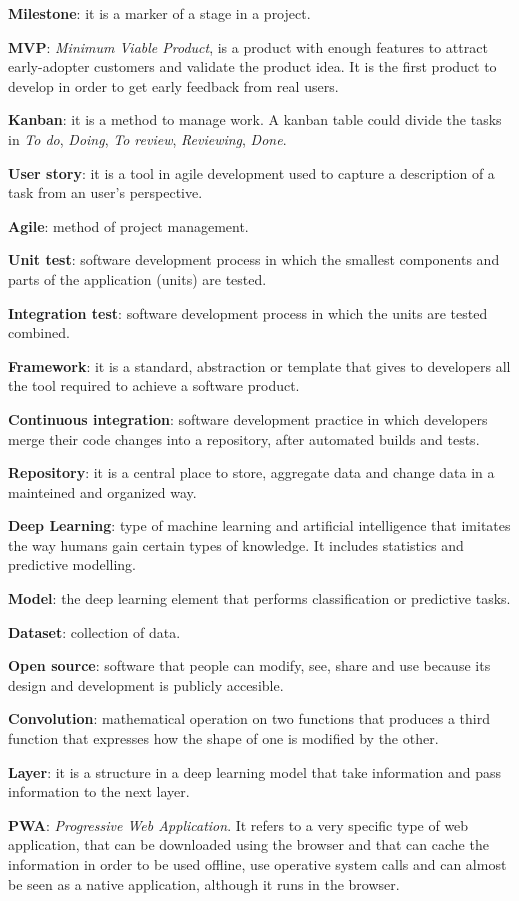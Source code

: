 \textbf{Milestone}: it is a marker of a stage in a project. 
\bigskip

\textbf{MVP}: \textit{Minimum Viable Product}, is a product with enough features to attract early-adopter customers and validate the product idea. It is the first product to develop in order to get early feedback from real users.
\bigskip

\textbf{Kanban}: it is a method to manage work. A kanban table could divide the tasks in \textit{To do}, \textit{Doing}, \textit{To review}, \textit{Reviewing}, \textit{Done}. 
\bigskip

\textbf{User story}: it is a tool in agile development used to capture a description of a task from an user's perspective.
\bigskip

\textbf{Agile}: method of project management.
\bigskip

\textbf{Unit test}: software development process in which the smallest components and parts of the application (units) are tested.
\bigskip

\textbf{Integration test}: software development process in which the units are tested combined.
\bigskip

\textbf{Framework}: it is a standard, abstraction or template that gives to developers all the tool required to achieve a software product.
\bigskip

\textbf{Continuous integration}: software development practice in which developers merge their code changes into a repository, after automated builds and tests.
\bigskip

\textbf{Repository}: it is a central place to store, aggregate data and change data in a mainteined and organized way.
\bigskip

\textbf{Deep Learning}: type of machine learning and artificial intelligence that imitates the way humans gain certain types of knowledge. It includes statistics and predictive modelling.
\bigskip

\textbf{Model}: the deep learning element that performs classification or predictive tasks. 
\bigskip

\textbf{Dataset}: collection of data.
\bigskip

\textbf{Open source}: software that people can modify, see, share and use because its design and development is publicly accesible.
\bigskip

\textbf{Convolution}: mathematical operation on two functions that produces a third function that expresses how the shape of one is modified by the other.
\bigskip

\textbf{Layer}: it is a structure in a deep learning model that take information and pass information to the next layer.
\bigskip

\textbf{PWA}: \textit{Progressive Web Application}. It refers to a very specific type of web application, that can be downloaded using the browser and that can cache the information in order to be used offline, use operative system calls and can almost be seen as a native application, although it runs in the browser.
\bigskip